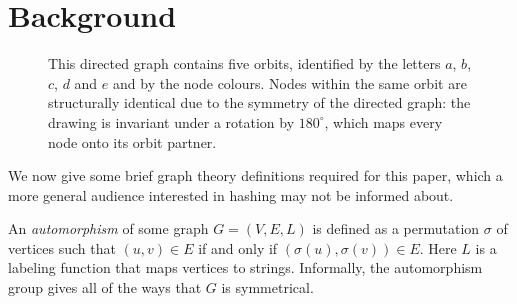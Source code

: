 \documentclass[twoside,leqno]{article}
\begin{document}
\section{Background}

\begin{figure}[!b]
\centering
{}
\caption{This directed graph contains five orbits, identified by the letters
$a$, $b$, $c$, $d$ and $e$ and by the node colours. Nodes within the same
orbit are structurally identical due to the symmetry of the directed graph:
the drawing is invariant under a rotation by $180^\circ$, which maps every
node onto its orbit partner.}
\label{fig:orbitexample}
\end{figure}

We now give some brief graph theory definitions required for this paper, which a more general audience interested in hashing may not be informed about.

An \textit{automorphism} of some graph $G=(V,E,L)$ is defined as a permutation $\sigma$ of vertices such that $(u, v) \in E$ if and only if $(\sigma(u), \sigma(v)) \in E$. Here $L$ is a labeling function that maps vertices to strings. Informally, the automorphism group gives all of the ways that $G$ is symmetrical.
\end{document}
